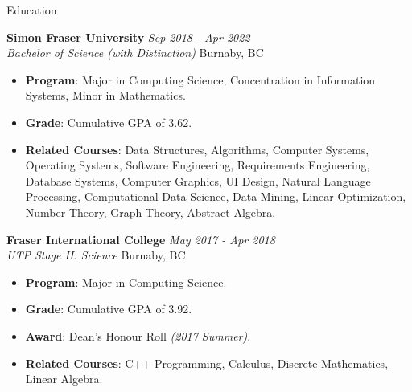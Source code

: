 \documentclass{resume} %
\begin{document}

\begin{rSection}{Education}

{\bf Simon Fraser University} \hfill {\em Sep 2018 - Apr 2022} 
\\{ \textit {Bachelor of Science (with Distinction)}} \hfill {Burnaby, BC} 
\begin{itemize}
  \vspace{-0.2cm}\item \textbf{Program}: Major in Computing Science, Concentration in Information Systems, Minor in Mathematics.
  \vspace{-0.2cm}\item \textbf{Grade}: Cumulative GPA of 3.62.
  \vspace{-0.2cm}\item \textbf{Related Courses}: Data Structures, Algorithms, Computer Systems, Operating Systems, Software Engineering, Requirements Engineering, Database Systems, Computer Graphics, UI Design, Natural Language Processing, Computational Data Science, Data Mining, Linear Optimization, Number Theory, Graph Theory, Abstract Algebra.
\end{itemize}

{\bf Fraser International College} \hfill {\em May 2017 - Apr 2018} 
\\{ \textit {UTP Stage II:  Science}} \hfill {Burnaby, BC} 
\begin{itemize}
  \vspace{-0.2cm}\item \textbf{Program}: Major in Computing Science.
  \vspace{-0.2cm}\item \textbf{Grade}: Cumulative GPA of 3.92.
  \vspace{-0.2cm}\item \textbf{Award}: Dean’s Honour Roll \textit{(2017 Summer)}.
  \vspace{-0.2cm}\item \textbf{Related Courses}: C++ Programming, Calculus, Discrete Mathematics, Linear Algebra.
\end{itemize}


\end{rSection}
\end{document}
